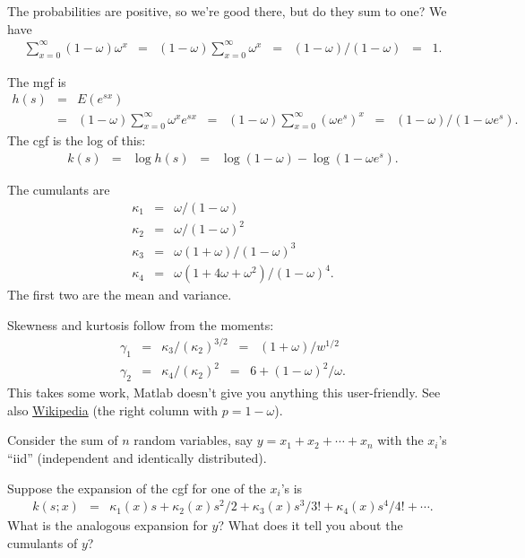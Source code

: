 \documentclass[11pt]{exam}
\begin{document}
\begin{questions}
\begin{solution}
\begin{parts}
\item The probabilities are positive, so we're good there, but do they sum to one?
We have
\begin{eqnarray*}
        \sum_{x=0}^\infty (1-\omega) \omega^x
            &=& (1-\omega)\sum_{x=0}^\infty \omega^x \;\;=\;\; (1-\omega) / (1-\omega) \;\;=\;\; 1.
\end{eqnarray*}
\item The mgf is
\begin{eqnarray*}
    h(s) &=& E( e^{sx}) \\
         &=&  (1-\omega) \sum_{x=0}^\infty \omega^x e^{sx}
         \;\;=\;\; (1-\omega) \sum_{x=0}^\infty (\omega e^{s})^x
         \;\;=\;\; (1-\omega) / (1-\omega e^s) .
\end{eqnarray*}
The cgf is the log of this:
\begin{eqnarray*}
    k(s) &=& \log h(s)
        \;\;=\;\; \log (1-\omega) - \log (1-\omega e^s) .
\end{eqnarray*}
\item The cumulants are
\begin{eqnarray*}
    \kappa_1 &=& \omega /(1-\omega) \\
    \kappa_2 &=& \omega /(1-\omega)^2 \\
    \kappa_3 &=& \omega (1+\omega) /(1-\omega)^3 \\
    \kappa_4 &=& \omega (1 + 4 \omega + \omega^2)/(1-\omega)^4 .
\end{eqnarray*}
The first two are the mean and variance.
\item Skewness and kurtosis follow from the moments:
\begin{eqnarray*}
    \gamma_1 &=& \kappa_3/(\kappa_2)^{3/2} \;\;=\;\; (1+\omega)/w^{1/2}  \\
    \gamma_2 &=& \kappa_4/(\kappa_2)^{2} \;\;=\;\; 6 + (1-\omega)^2/\omega .
\end{eqnarray*}
This takes some work, Matlab doesn't give you anything this user-friendly.
See also
\href{http://en.wikipedia.org/wiki/Geometric_distribution}{Wikipedia}
(the right column with $p = 1-\omega$).

\end{parts}
\end{solution}

Consider the sum of $n$ random variables,
say $ y = x_1 + x_2 + \cdots + x_n$ with the $x_i$'s ``iid''
(independent and identically distributed).
%
\begin{parts}
\item Suppose the expansion of the cgf for one of the $x_i$'s is
\begin{eqnarray*}
    k(s; x) &=& \kappa_1(x) s + \kappa_2(x) s^2/2 + \kappa_3(x) s^3/3! + \kappa_4(x) s^4/4! + \cdots .
\end{eqnarray*}
What is the analogous expansion for $y$?
What does it tell you about the cumulants of $y$?


\end{parts}
\end{questions}
\end{document}
